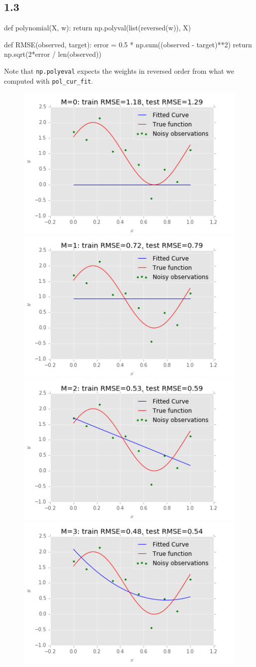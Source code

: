 \documentclass{article}
\begin{document}
\subsection*{1.3}
\begin{python}
def polynomial(X, w):
    return np.polyval(list(reversed(w)), X)

def RMSE(observed, target):
    error = 0.5 * np.sum((observed - target)**2)
    return np.sqrt(2*error / len(observed))
\end{python}
Note that \texttt{np.polyeval} expects the weights in reversed order from what we computed with \texttt{pol\_cur\_fit}.
\begin{figure}[H]
\centering
\includegraphics[width=.49\textwidth]{images/fit_m0_n_10.png}
\includegraphics[width=.49\textwidth]{images/fit_m1_n_10.png}
\includegraphics[width=.49\textwidth]{images/fit_m2_n_10.png}
\includegraphics[width=.49\textwidth]{images/fit_m3_n_10.png}

\end{figure}
\end{document}
